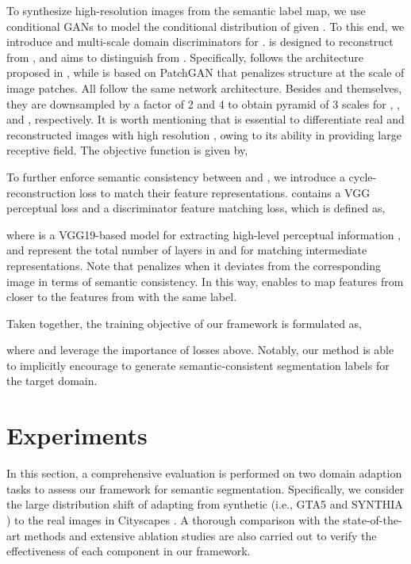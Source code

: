 \documentclass[runningheads]{llncs}
\begin{document}
	To synthesize high-resolution images from the semantic label map, we use conditional GANs \cite{isola2017image} to model the conditional distribution of  given . To this end, we introduce  and multi-scale domain discriminators  for .  is designed to reconstruct  from , and  aims to distinguish  from . Specifically,  follows the architecture proposed in \cite{johnson2016perceptual}, while  is based on PatchGAN \cite{isola2017image} that penalizes structure at the scale of image patches. All  follow the same network architecture. Besides  and  themselves, they are downsampled by a factor of 2 and 4 to obtain pyramid of 3 scales for , , and , respectively. It is worth mentioning that  is essential to differentiate real and reconstructed images with high resolution \cite{wang2017high}, owing to its ability in providing large receptive field. The objective function is given by,
	
	
	To further enforce semantic consistency between  and , we introduce a cycle-reconstruction loss  to match their feature representations.  contains a VGG perceptual loss and a discriminator feature matching loss, which is defined as,
	 
	where  is a VGG19-based model for extracting high-level perceptual information \cite{johnson2016perceptual},  and  represent the total number of layers in  and  for matching intermediate representations. Note that  penalizes  when it deviates from the corresponding image  in terms of semantic consistency. In this way,  enables to map features from  closer to the features from  with the same label. 
	
	Taken together, the training objective of our framework is formulated as,
	 
	where  and  leverage the importance of losses above. Notably, our method is able to implicitly encourage  to generate semantic-consistent segmentation labels for the target domain. 
	
	
	\section{Experiments}
	In this section, a comprehensive evaluation is performed on two domain adaption tasks to assess our framework for semantic segmentation. Specifically, we consider the large distribution shift of adapting from synthetic (i.e., GTA5 \cite{richter2016playing} and SYNTHIA \cite{ros2016synthia}) to the real images in Cityscapes \cite{cordts2016cityscapes}. A thorough comparison with the state-of-the-art methods and extensive ablation studies are also carried out to verify the effectiveness of each component in our framework. 
	
\end{document}
